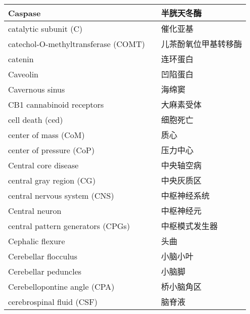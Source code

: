 \begin{longtable}{lll}
	\midrule
	Caspase   && 半胱天冬酶  \\
	
	\midrule
	catalytic subunit (C)   && 催化亚基  \\
	
	\midrule
	catechol-O-methyltransferase (COMT)  && 儿茶酚氧位甲基转移酶  \\
	
	\midrule
	catenin  && 连环蛋白  \\
	
	\midrule
	Caveolin   && 凹陷蛋白  \\
	
	\midrule
	Cavernous sinus   && 海绵窦  \\
	
	\midrule
	CB1 cannabinoid receptors   && 大麻素受体  \\
	
	\midrule
	cell death (ced)  && 细胞死亡  \\
	
	\midrule
	center of mass (CoM)   && 质心  \\
	
	\midrule
	center of pressure (CoP)   && 压力中心  \\
	
	\midrule
	Central core disease  && 中央轴空病  \\
	
	\midrule
	central gray region (CG)  && 中央灰质区  \\
	
	\midrule
	central nervous system (CNS)  && 中枢神经系统  \\
	
	\midrule
	Central neuron   && 中枢神经元  \\
	
	\midrule
	central pattern generators (CPGs)   && 中枢模式发生器  \\
	
	\midrule
	Cephalic flexure   && 头曲  \\
	
	\midrule
	Cerebellar flocculus   && 小脑小叶  \\
	
	\midrule
	Cerebellar peduncles   && 小脑脚  \\
	
	\midrule
	Cerebellopontine angle (CPA)   && 桥小脑角区  \\
	
	\midrule
	cerebrospinal fluid (CSF)   && 脑脊液  \\
	

\end{longtable}
